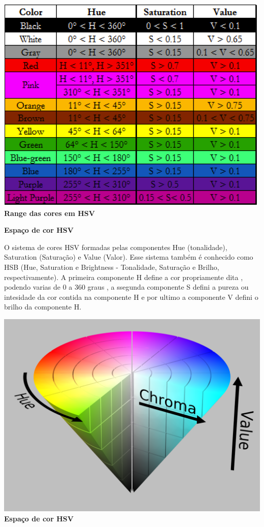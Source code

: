 \documentclass[a4paper]{article}
\begin{document}
\vspace{5.00mm}
\centering

\includegraphics[scale=0.8]{scale.png}
\centering
\\
\textbf{\normalsize Range das cores em HSV}

\begin{flushleft}
\textbf{\large Espaço de cor HSV}
\end{flushleft}
\raggedright
 O sistema de cores HSV formadas pelas componentes Hue (tonalidade), Saturation (Saturação) e Value (Valor). Esse sistema também é conhecido como HSB (Hue, Saturation e Brightness - Tonalidade, Saturação e Brilho, respectivamente). A primeira componente H define a cor propriamente dita , podendo varias de 0 a 360 graus , a ssegunda componente S defini a pureza ou intesidade da cor 
contida na componente H e por ultimo a componente V defini o brilho da componente H.

\vspace{5.00mm}
\centering

\includegraphics[scale=0.08]{hsv.png}
\\
\centering
\textbf{\normalsize Espaço de cor HSV}
\vspace{5.00mm}
\end{document}
